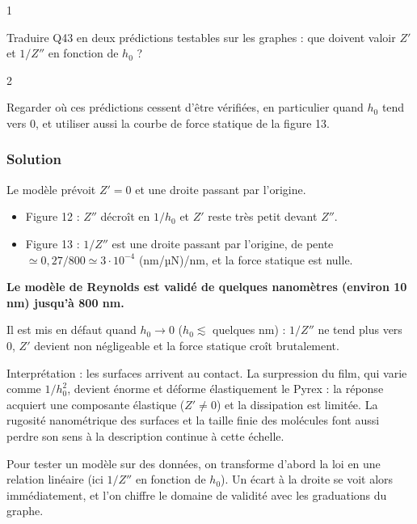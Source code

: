 \documentclass[11pt,a4paper]{article}
\providecommand{\tightlist}{\setlength{\itemsep}{0pt}\setlength{\parskip}{0pt}}
\newcommand{\equationajustee}[1]{%
  \sbox{\boiteequation}{$\displaystyle #1$}%
  \ifdim\wd\boiteequation>\linewidth
    \[\resizebox{\linewidth}{!}{\usebox{\boiteequation}}\]%
  \else
    \[#1\]%
  \fi}
\begin{document}
\begin{indication}{1}

Traduire Q43 en deux prédictions testables sur les graphes : que doivent valoir \(Z'\) et \(1/Z''\) en fonction de \(h_0\) ?

\end{indication}

\begin{indication}{2}

Regarder où ces prédictions cessent d'être vérifiées, en particulier quand \(h_0\) tend vers 0, et utiliser aussi la courbe de force statique de la figure 13.

\end{indication}

\hypertarget{solution-43}{%
\subsubsection{Solution}\label{solution-43}}

Le modèle prévoit \(Z'=0\) et
\equationajustee{\frac1{Z''}=\frac{h_0}{6\pi\eta\omega R_0^2} ,}
une droite passant par l'origine.

\begin{itemize}
\tightlist
\item
  Figure 12 : \(Z''\) décroît en \(1/h_0\) et \(Z'\) reste très petit devant \(Z''\).
\item
  Figure 13 : \(1/Z''\) est une droite passant par l'origine, de pente \(\simeq0{,}27/800\simeq3\cdot10^{-4}\) (nm/µN)/nm, et la force statique est nulle.
\end{itemize}

\textbf{Le modèle de Reynolds est validé de quelques nanomètres (environ 10 nm) jusqu'à 800 nm.}

Il est mis en défaut quand \(h_0\to0\) (\(h_0\lesssim\) quelques nm) : \(1/Z''\) ne tend plus vers 0, \(Z'\) devient non négligeable et la force statique croît brutalement.

Interprétation : les surfaces arrivent au contact. La surpression du film, qui varie comme \(1/h_0^2\), devient énorme et déforme élastiquement le Pyrex : la réponse acquiert une composante élastique (\(Z'\ne0\)) et la dissipation est limitée. La rugosité nanométrique des surfaces et la taille finie des molécules font aussi perdre son sens à la description continue à cette échelle.

\begin{methode}

Pour tester un modèle sur des données, on transforme d'abord la loi en une relation linéaire (ici \(1/Z''\) en fonction de \(h_0\)). Un écart à la droite se voit alors immédiatement, et l'on chiffre le domaine de validité avec les graduations du graphe.

\end{methode}
\end{document}
